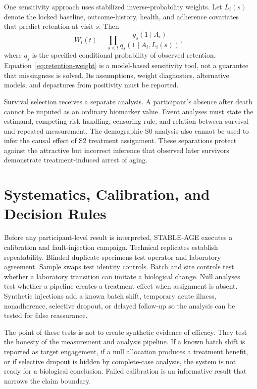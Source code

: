 \documentclass[10pt,conference]{IEEEtran}
\begin{document}
One sensitivity approach uses stabilized inverse-probability weights. Let $L_i(s)$ denote the locked baseline, outcome-history, health, and adherence covariates that predict retention at visit $s$. Then
\begin{equation}
W_i(t)=\prod_{s\leq t}\frac{q_s(1\mid A_i)}{q_s(1\mid A_i,L_i(s))},
\label{eq:retention-weight}
\end{equation}
where $q_s$ is the specified conditional probability of observed retention. Equation~\eqref{eq:retention-weight} is a model-based sensitivity tool, not a guarantee that missingness is solved. Its assumptions, weight diagnostics, alternative models, and departures from positivity must be reported.

Survival selection receives a separate analysis. A participant's absence after death cannot be imputed as an ordinary biomarker value. Event analyses must state the estimand, competing-risk handling, censoring rule, and relation between survival and repeated measurement. The demographic S0 analysis also cannot be used to infer the causal effect of S2 treatment assignment. These separations protect against the attractive but incorrect inference that observed later survivors demonstrate treatment-induced arrest of aging.

\section{Systematics, Calibration, and Decision Rules}
\label{sec:systematics}

Before any participant-level result is interpreted, STABLE-AGE executes a calibration and fault-injection campaign. Technical replicates establish repeatability. Blinded duplicate specimens test operator and laboratory agreement. Sample swaps test identity controls. Batch and site controls test whether a laboratory transition can imitate a biological change. Null analyses test whether a pipeline creates a treatment effect when assignment is absent. Synthetic injections add a known batch shift, temporary acute illness, nonadherence, selective dropout, or delayed follow-up so the analysis can be tested for false reassurance.

The point of these tests is not to create synthetic evidence of efficacy. They test the honesty of the measurement and analysis pipeline. If a known batch shift is reported as target engagement, if a null allocation produces a treatment benefit, or if selective dropout is hidden by complete-case analysis, the system is not ready for a biological conclusion. Failed calibration is an informative result that narrows the claim boundary.
\end{document}
